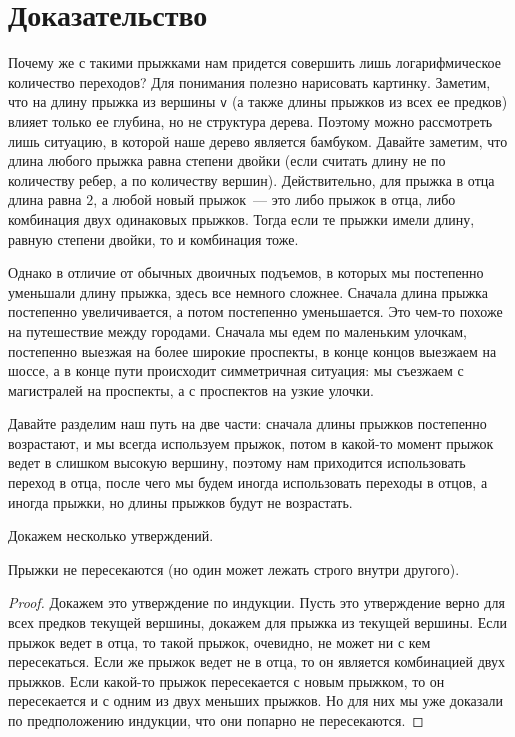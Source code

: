 \section{Доказательство}

Почему же с такими прыжками нам придется совершить лишь логарифмическое количество переходов? Для понимания полезно нарисовать картинку. Заметим, что на длину прыжка из вершины \verb+v+ (а также длины прыжков из всех ее предков) влияет только ее глубина, но не структура дерева. Поэтому можно рассмотреть лишь ситуацию, в которой наше дерево является бамбуком. Давайте заметим, что длина любого прыжка равна степени двойки (если считать длину не по количеству ребер, а по количеству вершин). Действительно, для прыжка в отца длина равна $2$, а любой новый прыжок~--- это либо прыжок в отца, либо комбинация двух одинаковых прыжков. Тогда если те прыжки имели длину, равную степени двойки, то и комбинация тоже.

Однако в отличие от обычных двоичных подъемов, в которых мы постепенно уменьшали длину прыжка, здесь все немного сложнее. Сначала длина прыжка постепенно увеличивается, а потом постепенно уменьшается. Это чем-то похоже на путешествие между городами. Сначала мы едем по маленьким улочкам, постепенно выезжая на более широкие проспекты, в конце концов выезжаем на шоссе, а в конце пути происходит симметричная ситуация: мы съезжаем с магистралей на проспекты, а с проспектов на узкие улочки.

Давайте разделим наш путь на две части: сначала длины прыжков постепенно возрастают, и мы всегда используем прыжок, потом в какой-то момент прыжок ведет в слишком высокую вершину, поэтому нам приходится использовать переход в отца, после чего мы будем иногда использовать переходы в отцов, а иногда прыжки, но длины прыжков будут не возрастать.

Докажем несколько утверждений.

\begin{theorem}
    Прыжки не пересекаются (но один может лежать строго внутри другого).
\end{theorem}

\begin{proof}
    Докажем это утверждение по индукции. Пусть это утверждение верно для всех предков текущей вершины, докажем для прыжка из текущей вершины.
    Если прыжок ведет в отца, то такой прыжок, очевидно, не может ни с кем пересекаться. Если же прыжок ведет не в отца, то он является комбинацией двух прыжков. Если какой-то прыжок пересекается с новым прыжком, то он пересекается и с одним из двух меньших прыжков. Но для них мы уже доказали по предположению индукции, что они попарно не пересекаются.
\end{proof}

